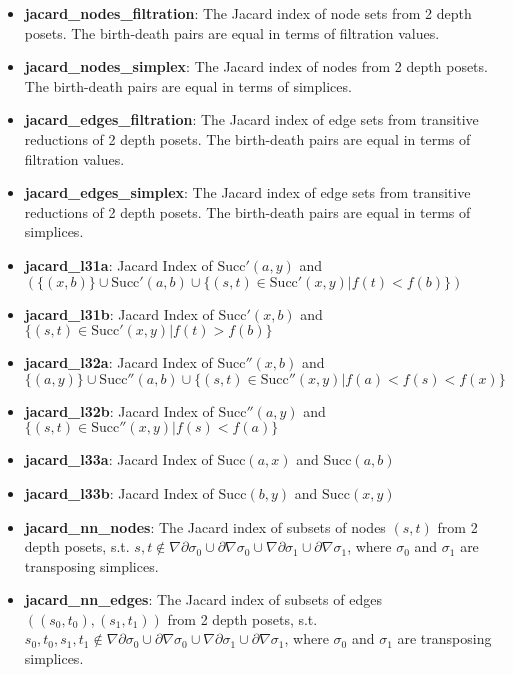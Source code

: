 \documentclass{article}
\begin{document}
\begin{itemize}

    \item \textbf{jacard\_nodes\_filtration}: The Jacard index of node sets from 2 depth posets.
    The birth-death pairs are equal in terms of filtration values.
    
    \item \textbf{jacard\_nodes\_simplex}: The Jacard index of nodes from 2 depth posets.
    The birth-death pairs are equal in terms of simplices.
    
    \item \textbf{jacard\_edges\_filtration}: The Jacard index of edge sets from transitive reductions of 2 depth posets.
    The birth-death pairs are equal in terms of filtration values.
    
    \item \textbf{jacard\_edges\_simplex}: The Jacard index of edge sets from transitive reductions of 2 depth posets.
    The birth-death pairs are equal in terms of simplices.
    
    \item \textbf{jacard\_l31a}: Jacard Index of $\text{Succ}'(a, y)$ and $(\{(x, b)\} \cup \text{Succ}'(a, b) \cup \{(s, t)\in \text{Succ}'(x, y) | f(t)<f(b)\})$
    
    \item \textbf{jacard\_l31b}: Jacard Index of $\text{Succ}'(x, b)$ and $\{(s, t)\in \text{Succ}'(x, y) | f(t) > f(b)\}$
    
    \item \textbf{jacard\_l32a}: Jacard Index of $\text{Succ}''(x, b)$ and $\{(a, y)\} \cup \text{Succ}''(a, b) \cup \{(s, t)\in \text{Succ}''(x, y) | f(a) < f(s) < f(x)\}$
    
    \item \textbf{jacard\_l32b}: Jacard Index of $\text{Succ}''(a, y)$ and $\{(s, t)\in \text{Succ}''(x, y) | f(s) < f(a)\}$
    
    \item \textbf{jacard\_l33a}: Jacard Index of $\text{Succ}(a, x)$ and $\text{Succ}(a, b)$
    
    \item \textbf{jacard\_l33b}: Jacard Index of $\text{Succ}(b, y)$ and $\text{Succ}(x, y)$
    
    \item \textbf{jacard\_nn\_nodes}: The Jacard index of subsets of nodes $(s, t)$ from 2 depth posets, s.t. 
    $s, t \notin \nabla\partial\sigma_0 \cup \partial\nabla\sigma_0 \cup \nabla\partial\sigma_1 \cup \partial\nabla\sigma_1$,
    where $\sigma_0$ and $\sigma_1$ are transposing simplices.
    
    \item \textbf{jacard\_nn\_edges}: The Jacard index of subsets of edges $((s_0, t_0), (s_1, t_1))$ from 2 depth posets, s.t. 
    $s_0, t_0, s_1, t_1 \notin \nabla\partial\sigma_0 \cup \partial\nabla\sigma_0 \cup \nabla\partial\sigma_1 \cup \partial\nabla\sigma_1$,
    where $\sigma_0$ and $\sigma_1$ are transposing simplices.
    
\end{itemize}
\end{document}
